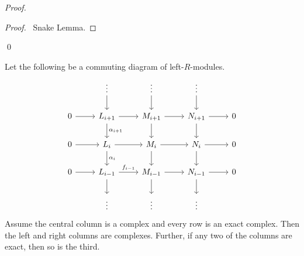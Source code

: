 \begin{proof}
\pf
{}
\begin{proof}
	\pf\ Snake Lemma.
\end{proof}
\qed
\end{proof}

\begin{thm}
Let the following be a commuting diagram of left-$R$-modules.
\[ \begin{tikzcd}
& \vdots \arrow[d] & \vdots \arrow[d] & \vdots \arrow[d] \\
0 \arrow[r] & L_{i+1} \arrow[r] \arrow[d,"\alpha_{i+1}"] & M_{i+1} \arrow[r] \arrow[d] & N_{i+1} \arrow[r] \arrow[d] & 0 \\
0 \arrow[r] & L_i \arrow[r] \arrow[d,"\alpha_i"] & M_i \arrow[r] \arrow[d] & N_i \arrow[r] \arrow[d] & 0 \\
0 \arrow[r] & L_{i-1} \arrow[r,"f_{i-1}"] \arrow[d] & M_{i-1} \arrow[r] \arrow[d] & N_{i-1} \arrow[r] \arrow[d] & 0 \\
& \vdots & \vdots & \vdots
\end{tikzcd} \]
Assume the central column is a complex and every row is an exact complex. Then the left and right columns are complexes. Further, if any two of the columns are exact, then so is the third.
\end{thm}


